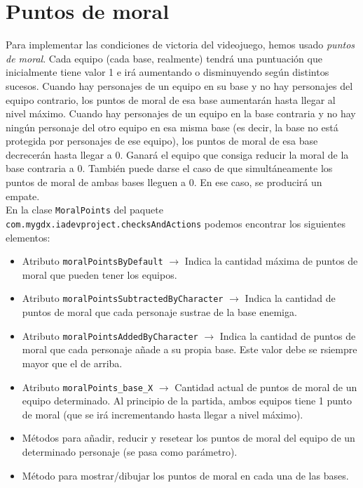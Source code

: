 \medskip
\section{Puntos de moral}

Para implementar las condiciones de victoria del videojuego, hemos usado \textit{puntos de moral}. Cada equipo (cada base, realmente) tendrá una puntuación que inicialmente tiene valor 1 e irá aumentando o disminuyendo según distintos sucesos. Cuando hay personajes de un equipo en su base y no hay personajes del equipo contrario, los puntos de moral de esa base aumentarán hasta llegar al nivel máximo. Cuando hay personajes de un equipo en la base contraria y no hay ningún personaje del otro equipo en esa misma base (es decir, la base no está protegida por personajes de ese equipo), los puntos de moral de esa base decrecerán hasta llegar a 0. Ganará el equipo que consiga reducir la moral de la base contraria a 0. También puede darse el caso de que simultáneamente los puntos de moral de ambas bases lleguen a 0. En ese caso, se producirá un empate. \\

En la clase \texttt{MoralPoints} del paquete \texttt{com.mygdx.iadevproject.checksAndActions} podemos encontrar los siguientes elementos:
\begin{itemize}
	\item Atributo \texttt{moralPointsByDefault} $\rightarrow$ Indica la cantidad máxima de puntos de moral que pueden tener los equipos.
	\item Atributo \texttt{moralPointsSubtractedByCharacter} $\rightarrow$ Indica la cantidad de puntos de moral que cada personaje sustrae de la base enemiga.
	\item Atributo \texttt{moralPointsAddedByCharacter} $\rightarrow$ Indica la cantidad de puntos de moral que cada personaje añade a su propia base. Este valor debe se rsiempre mayor que el de arriba.
	\item Atributo \texttt{moralPoints\_base\_X} $\rightarrow$ Cantidad actual de puntos de moral de un equipo determinado. Al principio de la partida, ambos equipos tiene 1 punto de moral (que se irá incrementando hasta llegar a nivel máximo).
	\item Métodos para añadir, reducir y resetear los puntos de moral del equipo de un determinado personaje (se pasa como parámetro).
	\item Método para mostrar/dibujar los puntos de moral en cada una de las bases.
\end{itemize}

